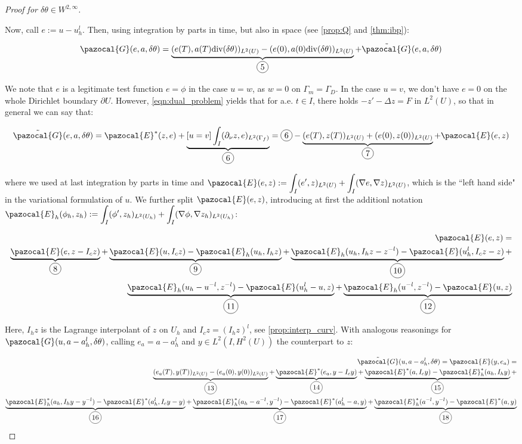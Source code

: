 \documentclass[english,a4paper,10pt,oneside]{scrbook}	%
\theoremstyle{break}
\newenvironment{mproof}[1][\proofname]{%
  \begin{proof}[#1]$ $\par\nobreak\ignorespaces
}{%
  \end{proof}
}
\renewcommand*{\proofname}{Proof}
\theoremstyle{remark}
\newcommand{\ds}{\displaystyle}
\newcommand{\te}{\theta}
\newcommand{\dive}{\text{div}}
\newcommand*\circled[1]{\tikz[baseline=(char.base)]{
            \node[shape=circle,draw,inner sep=2pt] (char) {#1};}}
\newcommand{\mE}{\pazocal{E}}
\newcommand{\mG}{\pazocal{G}}
\begin{document}
\begin{mproof}[Proof for $\delta \te \in W^{2,\infty}$]
Now, call $e:=u-u_h^l$. Then, using integration by parts in time, but also in space (see \cref{prop:Q} and \cref{thm:ibp}):

\begin{align*}
	\mG(e,a,\delta \te) = \underbrace{(e(T),a(T)\dive(\delta \te))_{L^2(U)}-(e(0) ,a(0)\dive(\delta \te))_{L^2(U)}}_{\circled{5}} + \tilde{\mG}(e, a, \delta \te)
\end{align*}

We note that $e$ is a legitimate test function $e=\phi$ in the case $u=w$, as $w=0$ on $\Gamma_m=\Gamma_D$. In the case $u=v$, we don't have $e=0$ on the whole Dirichlet boundary $\partial U$. However, \cref{eqn:dual_problem} yields that for a.e. $t \in I$, there holds $-z'-\Delta z = F$ in $L^2(U)$, so that in general we can say that:

\begin{align*}
	 \tilde{\mG}(e, a, \delta \te) = \mE^*(z,e) + \underbrace{\left [ u=v \right ]\int_I(\partial_\nu z, e)_{L^2(\Gamma_f)}}_{\circled{6}} = \circled{6}  -\underbrace{(e(T),z(T))_{L^2(U)}+(e(0) ,z(0))_{L^2(U)}}_{\circled{7}} + \mE(e,z)
\end{align*} 

where we used at last integration by parts in time and $\mE(e,z):=\ds \int_I(e',z)_{L^2(U)} + \int_I (\nabla e, \nabla z)_{L^2(U)}$, which is the ``left hand side" in the variational formulation of $u$. We further split $\mE(e,z)$, introducing at first the additionl notation $\mE_h(\phi_h,z_h):=\ds \int_I(\phi',z_h)_{L^2(U_h)} + \int_I (\nabla \phi, \nabla z_h)_{L^2(U_h)}$:

\begin{align*}
	\mE(e,z) =\\ \underbrace{\mE(e,z-I_c z)}_{\circled{8}} +
	\underbrace{\mE(u,I_c z) - \mE_h(u_h,I_hz)}_{\circled{9}}+
	\underbrace{\mE_h(u_h,I_hz-z^{-l})-\mE(u_h^l,I_cz-z)}_{\circled{10}}+\\
	\underbrace{\mE_h(u_h-u^{-l}, z^{-l})-\mE(u_h^l-u,z)}_{\circled{11}}+
	\underbrace{\mE_h(u^{-l},z^{-l})-\mE(u,z)}_{\circled{12}}
\end{align*}

Here, $I_hz$ is the Lagrange interpolant of $z$ on $U_h$ and $I_c z = (I_hz)^l$, see \cref{prop:interp_curv}. 
With analogous reasonings for $	\mG(u, a-a_h^l,\delta \te)$, calling $e_a = a-a_h^l$ and $y \in L^2(I,H^2(U))$ the counterpart to $z$:

\begin{align*}
	\tilde{\mG}(u, a-a_h^l, \delta \te) = \mE(y,e_a) =\\
	\underbrace{(e_a(T),y(T))_{L^2(U)}-(e_a(0) ,y(0))_{L^2(U)}}_{\circled{13}}+
	\underbrace{\mE^*(e_a,y-I_c y)}_{\circled{14}} +
	\underbrace{\mE^*(a,I_c y) - \mE_h^*(a_h,I_hy)}_{\circled{15}}+\\
	\underbrace{\mE_h^*(a_h,I_hy-y^{-l})-\mE^*(a_h^l,I_cy-y)}_{\circled{16}}+
	\underbrace{\mE_h^*(a_h-a^{-l}, y^{-l})-\mE^*(a_h^l-a,y)}_{\circled{17}}+
	\underbrace{\mE_h^*(a^{-l},y^{-l})-\mE^*(a,y)}_{\circled{18}}
\end{align*}


\end{mproof}
\end{document}
